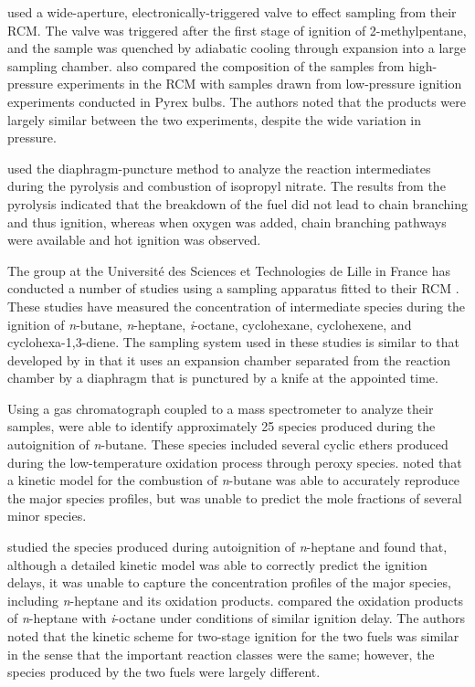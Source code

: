 \documentclass[../main.tex]{subfiles}
\begin{document}
\textcite{Affleck1967} used a wide-aperture, electronically-triggered valve
to effect sampling from their RCM. The valve was triggered after the first
stage of ignition of 2-methylpentane, and the sample was quenched by
adiabatic cooling through expansion into a large sampling chamber.
\textcite{Affleck1967} also compared the composition of the samples from
high-pressure experiments in the RCM with samples drawn from low-pressure
ignition experiments conducted in Pyrex bulbs. The authors noted that
the products were largely similar between the two experiments, despite the
wide variation in pressure.

\textcite{Beeley1980} used the diaphragm-puncture method to analyze the
reaction intermediates during the pyrolysis and combustion of isopropyl
nitrate. The results from the pyrolysis indicated that the breakdown
of the fuel did not lead to chain branching and thus ignition, whereas
when oxygen was added, chain branching pathways were available and hot
ignition was observed.

The group at the Université des Sciences et Technologies de Lille in France
has conducted a number of studies using a sampling apparatus fitted to
their RCM \cite{Minetti1994, Minetti1995, Minetti1996, Lemaire2001,
Ribaucour2002}. These studies have measured the concentration of
intermediate species during the ignition of \textit{n}-butane,
\textit{n}-heptane, \textit{i}-octane, cyclohexane, cyclohexene, and
cyclohexa-1,3-diene. The sampling system used in these studies
is similar to that developed by \textcite{Roblee1961} in that it uses an
expansion chamber separated from the reaction chamber by a diaphragm
that is punctured by a knife at the appointed time.

Using a gas chromatograph coupled to a mass spectrometer to analyze their
samples, \textcite{Minetti1994} were able to identify approximately 25
species produced during the autoignition of \textit{n}-butane. These
species included several cyclic ethers produced during the low-temperature
oxidation process through peroxy species. \textcite{Minetti1994} noted
that a kinetic model for the combustion of \textit{n}-butane was able
to accurately reproduce the major species profiles, but was unable to predict
the mole fractions of several minor species.

\textcite{Minetti1995} studied the species produced during autoignition
of \textit{n}-heptane and found that, although a detailed kinetic model
was able to correctly predict the ignition delays, it was unable to
capture the concentration profiles of the major species, including
\textit{n}-heptane and its oxidation products. \textcite{Minetti1996}
compared the oxidation products of \textit{n}-heptane with
\textit{i}-octane under conditions of similar ignition delay. The
authors noted that the kinetic scheme for two-stage ignition for the
two fuels was similar in the sense that the important reaction classes
were the same; however, the species produced by the two fuels were
largely different.
\end{document}
